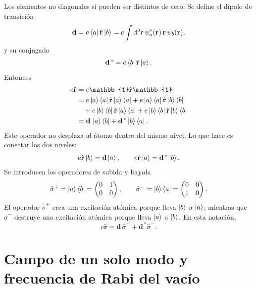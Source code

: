\documentclass[11pt]{article}
\newcommand{\dd}{\mathrm{d}}
\newcommand{\vb}[1]{\mathbf{#1}}
\newcommand{\splus}{\hat\sigma^+}
\newcommand{\sminus}{\hat\sigma^-}
\begin{document}
Los elementos no diagonales s\'i pueden ser distintos de cero. Se define el
dipolo de transici\'on
\begin{equation}
  \vb d
  =
  e\bra a\hat{\vb r}\ket b
  =
  e\int \dd^3r\,\psi_a^*(\vb r)\,\vb r\,\psi_b(\vb r),
\end{equation}
y su conjugado
\begin{equation}
  \vb d^{\,*}
  =
  e\bra b\hat{\vb r}\ket a.
\end{equation}
Entonces
\begin{align}
  e\hat{\vb r}
  &=
  e\mathbb{1}\hat{\vb r}\mathbb{1}                                            \\
  &=
  e\ket a\bra a\hat{\vb r}\ket a\bra a
  +
  e\ket a\bra a\hat{\vb r}\ket b\bra b                                      \\
  &\quad
  +
  e\ket b\bra b\hat{\vb r}\ket a\bra a
  +
  e\ket b\bra b\hat{\vb r}\ket b\bra b                                      \\
  &=
  \vb d\,\ket a\bra b
  +
  \vb d^{\,*}\ket b\bra a.
\end{align}
Este operador no desplaza al \'atomo dentro del mismo nivel. Lo que hace es
conectar los dos niveles:
\begin{equation}
  e\hat{\vb r}\ket b
  =
  \vb d\ket a,
  \qquad
  e\hat{\vb r}\ket a
  =
  \vb d^{\,*}\ket b.
\end{equation}
Se introducen los operadores de subida y bajada
\begin{equation}
  \splus
  =
  \ket a\bra b
  =
  \begin{pmatrix}
    0&1\\
    0&0
  \end{pmatrix},
  \qquad
  \sminus
  =
  \ket b\bra a
  =
  \begin{pmatrix}
    0&0\\
    1&0
  \end{pmatrix}.
\end{equation}
El operador \(\splus\) crea una excitaci\'on at\'omica porque lleva
\(\ket b\) a \(\ket a\), mientras que \(\sminus\) destruye una excitaci\'on
at\'omica porque lleva \(\ket a\) a \(\ket b\). En esta notaci\'on,
\begin{equation}
  \boxed{
  e\hat{\vb r}
  =
  \vb d\,\splus+\vb d^{\,*}\sminus .
  }
\end{equation}

\section{Campo de un solo modo y frecuencia de Rabi del vac\'io}
\end{document}

